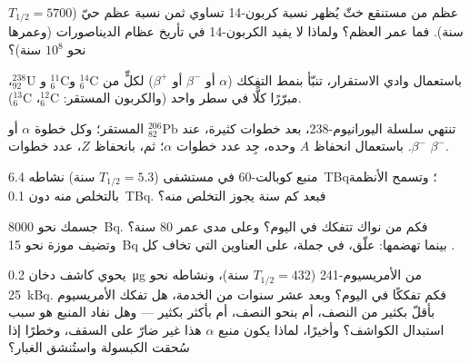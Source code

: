 \begin{exercise}[$\star\star$]\label{exo:g11:nucleus-radioactivity:10}
عظم من مستنقع خثّ يُظهر نسبة كربون-14 تساوي ثمن نسبة عظم
حيّ ($T_{1/2} = \num{5700}$ سنة). فما عمر العظم؟ ولماذا لا يفيد
الكربون-14 في تأريخ عظام الديناصورات (وعمرها نحو $10^{8}$ سنة)؟
\end{exercise}

\begin{exercise}[$\star\star$]\label{exo:g11:nucleus-radioactivity:11}
باستعمال وادي الاستقرار، تنبّأ بنمط التفكك ($\alpha$ أو $\beta^-$ أو
$\beta^+$) لكلٍّ من ${}^{14}_{6}\mathrm{C}$ و${}^{11}_{6}\mathrm{C}$ و
${}^{238}_{92}\mathrm{U}$، مبرّرًا كلًّا في سطر واحد (والكربون المستقر:
${}^{12}_{6}\mathrm{C}$، ${}^{13}_{6}\mathrm{C}$).
\end{exercise}

\begin{exercise}[$\star\star\star$]\label{exo:g11:nucleus-radioactivity:12}
تنتهي سلسلة اليورانيوم-238، بعد خطوات كثيرة، عند
${}^{206}_{82}\mathrm{Pb}$ المستقر؛ وكل خطوة $\alpha$ أو $\beta^-$. باستعمال
انحفاظ $A$ وحده، جِد عدد خطوات $\alpha$؛ ثم، بانحفاظ
$Z$، عدد خطوات $\beta^-$.
\end{exercise}

\begin{exercise}[$\star\star\star$]\label{exo:g11:nucleus-radioactivity:13}
منبع كوبالت-60 في مستشفى ($T_{1/2} = 5.3$ سنة) نشاطه
\qty{6.4}{TBq}؛ وتسمح الأنظمة بالتخلص منه دون \qty{0.1}{TBq}. فبعد كم
سنة يجوز التخلص منه؟
\end{exercise}

\begin{exercise}[$\star\star\star$]\label{exo:g11:nucleus-radioactivity:14}
 جسمك نحو \qty{8000}{Bq}. فكم  من نواك تتفكك
في اليوم؟ وعلى مدى عمر $80$ سنة؟ وتضيف موزة نحو \qty{15}{Bq} بينما
تهضمها: علّق، في جملة، على العناوين التي تخاف كل .
\end{exercise}

\begin{exercise}[$\star\star\star$]\label{exo:g11:nucleus-radioactivity:15}
يحوي كاشف دخان \qty{0.2}{\micro\gram} من الأمريسيوم-241
($T_{1/2} = 432$ سنة)، ونشاطه نحو \qty{25}{kBq}. فكم تفككًا
في اليوم؟ وبعد عشر سنوات من الخدمة، هل تفكك الأمريسيوم بأقلّ
بكثير من النصف، أم بنحو النصف، أم بأكثر بكثير --- وهل نفاد المنبع هو سبب
استبدال الكواشف؟ وأخيرًا، لماذا يكون منبع $\alpha$ هذا غير ضارّ على
السقف، وخطرًا إذا سُحقت الكبسولة واستُنشق الغبار؟
\end{exercise}


